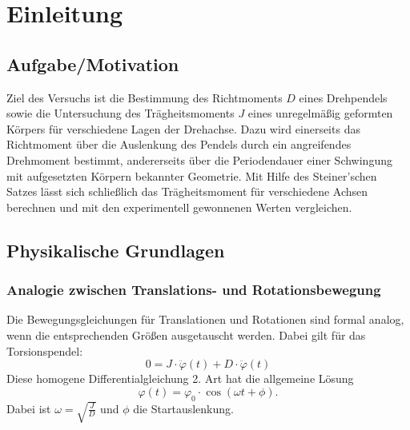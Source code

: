 \chapter{Einleitung}

\section{Aufgabe/Motivation}
Ziel des Versuchs ist die Bestimmung des Richtmoments $D$ eines Drehpendels sowie die Untersuchung des Trägheitsmoments $J$ eines unregelmäßig geformten Körpers für verschiedene Lagen der Drehachse. Dazu wird einerseits das Richtmoment über die Auslenkung des Pendels durch ein angreifendes Drehmoment bestimmt, andererseits über die Periodendauer einer Schwingung mit aufgesetzten Körpern bekannter Geometrie. Mit Hilfe des Steiner’schen Satzes lässt sich schließlich das Trägheitsmoment für verschiedene Achsen berechnen und mit den experimentell gewonnenen Werten vergleichen.

\section{Physikalische Grundlagen}
\subsection*{Analogie zwischen Translations- und Rotationsbewegung}
Die Bewegungsgleichungen für Translationen und Rotationen sind formal analog, wenn die entsprechenden Größen ausgetauscht werden. Dabei gilt für das Torsionspendel:
\begin{equation}
    0 = J \cdot \ddot \varphi(t) + D \cdot \ddot \varphi(t)
\end{equation}
Diese homogene Differentialgleichung 2. Art hat die allgemeine Lösung
\begin{equation}
    \varphi(t) = \varphi_0 \cdot \cos(\omega t + \phi).
\end{equation}
Dabei ist $\omega = \sqrt{\frac{J}{D}}$ und $\phi$ die Startauslenkung.

